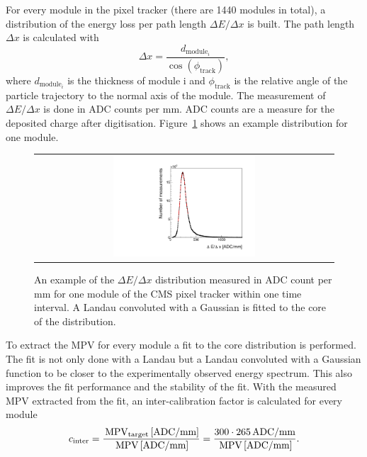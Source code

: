 For every module in the pixel tracker (there are 1440 modules in total), a distribution of the energy loss per path length $\Delta E/\Delta x$ is built.
The path length $\Delta x$ is calculated with
\begin{equation}
\Delta x = \frac{d_{\text{module}_i}}{\cos(\phi_{\text{track}})},
\end{equation}
where $d_{\text{module}_i}$ is the thickness of module i and $\phi_{\text{track}}$ is the relative angle of the particle trajectory to the normal axis of the module.
The measurement of $\Delta E/\Delta x$ is done in ADC counts per mm.
ADC counts are a measure for the deposited charge after digitisation.
Figure~\ref{fig:dEdx_Module} shows an example distribution for one module. 
\begin{figure}[!t]
  \centering 
  \begin{tabular}{c}
  \includegraphics[width=0.49\textwidth]{figures/analysis/Landau_Module_352476680.pdf}
  \end{tabular}
  \caption{An example of the $\Delta E/\Delta x$ distribution measured in ADC count per mm for one module of the CMS pixel tracker within one time interval. 
           A Landau convoluted with a Gaussian is fitted to the core of the distribution.}%
  \label{fig:dEdx_Module}
\end{figure}
To extract the MPV for every module a fit to the core distribution is performed.
The fit is not only done with a Landau but a Landau convoluted with a Gaussian function to be closer to the experimentally observed energy spectrum.
This also improves the fit performance and the stability of the fit.
With the measured MPV extracted from the fit, an inter-calibration factor is calculated for every module
\begin{equation}
c_{\text{inter}}=\frac{\,\text{MPV}_{\text{target}}\, [\text{ADC/mm}]}{\,\text{MPV}\, [\text{ADC/mm}]} = \frac{300 \cdot 265 \, \text{ADC/mm}}{\,\text{MPV}\, [\text{ADC/mm}]}.
\end{equation}
